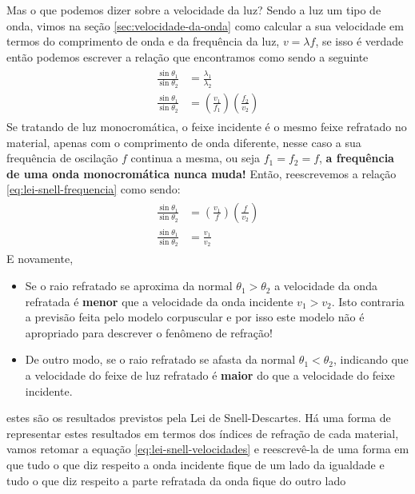 Mas o que podemos dizer sobre a velocidade da luz? Sendo a luz um tipo de onda, vimos na seção \ref{sec:velocidade-da-onda} como calcular a sua velocidade em termos do comprimento de onda e da frequência da luz, $v=\lambda f$, se isso é verdade então podemos escrever a relação que encontramos como sendo a seguinte
\begin{align}
    \begin{split}
        \label{eq:lei-snell-frequencia}
        \frac{\sin\theta_1}{\sin\theta_2}&=\frac{\lambda_1}{\lambda_2}\\
        \frac{\sin\theta_1}{\sin\theta_2}&=\left(\frac{v_1}{f_1}\right)\left(\frac{f_2}{v_2}\right)
    \end{split}
\end{align}
Se tratando de luz monocromática, o feixe incidente é o mesmo feixe refratado no material, apenas com o comprimento de onda diferente, nesse caso a sua frequência de oscilação $f$ continua a mesma, ou seja $f_1=f_2=f$, \textbf{a frequência de uma onda monocromática nunca muda!} Então, reescrevemos a relação \eqref{eq:lei-snell-frequencia} como sendo:
\begin{align}
    \begin{split}
        \frac{\sin\theta_1}{\sin\theta_2}&=\left(\frac{v_1}{f}\right)\left(\frac{f}{v_2}\right)\\
        \frac{\sin\theta_1}{\sin\theta_2}&=\frac{v_1}{v_2}\label{eq:lei-snell-velocidades}
    \end{split}
\end{align}
E novamente,
\begin{itemize}
    \item Se o raio refratado se aproxima da normal $\theta_1>\theta_2$ a velocidade da onda refratada é \textbf{menor} que a velocidade da onda incidente $v_1>v_2$. Isto contraria a previsão feita pelo modelo corpuscular e por isso este modelo não é apropriado para descrever o fenômeno de refração!
    \item De outro modo, se o raio refratado se afasta da normal $\theta_1<\theta_2$, indicando que a velocidade do feixe de luz refratado é \textbf{maior} do que a velocidade do feixe incidente.
\end{itemize}
estes são os resultados previstos pela Lei de Snell-Descartes. Há uma forma de representar estes resultados em termos dos índices de refração de cada material, vamos retomar a equação \eqref{eq:lei-snell-velocidades} e reescrevê-la de uma forma em que tudo o que diz respeito a onda incidente fique de um lado da igualdade e tudo o que diz respeito a parte refratada da onda fique do outro lado
